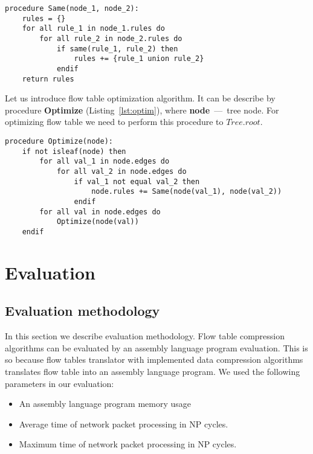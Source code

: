 \documentclass[conference]{IEEEtran}
\begin{document}
\begin{lstlisting}[float=htb,caption=Procedure for obtaining a set of rules derivedfrom the same rules,label=lst:same]
procedure Same(node_1, node_2):
    rules = {}
    for all rule_1 in node_1.rules do
        for all rule_2 in node_2.rules do
            if same(rule_1, rule_2) then
                rules += {rule_1 union rule_2}
            endif
    return rules
\end{lstlisting}

            Let us introduce flow table optimization algorithm. It can be describe by procedure \textbf{Optimize} (Listing~\ref{lst:optim}), 
            where \textbf{node}~---~tree node. For optimizing flow table we need to perform this procedure to \(Tree.root\).

\begin{lstlisting}[float=htb,caption=Procedure for optimizing the tree,label=lst:optim]
procedure Optimize(node):
    if not isleaf(node) then
        for all val_1 in node.edges do
            for all val_2 in node.edges do
                if val_1 not equal val_2 then
                    node.rules += Same(node(val_1), node(val_2))
                endif
        for all val in node.edges do
            Optimize(node(val))
    endif
\end{lstlisting}

    \section{Evaluation}
        \subsection{Evaluation methodology}
        In this section we describe evaluation methodology. Flow table compression algorithms can be evaluated by an 
        assembly language program evaluation. This is so because flow tables translator with implemented data compression algorithms 
        translates flow table into an assembly language program.
        We used the following parameters in our evaluation:
        \begin{itemize}
            \item An assembly language program memory usage%
            \item Average time of network packet processing in NP cycles.
            \item Maximum time of network packet processing in NP cycles.
        \end{itemize}
        
\end{document}
